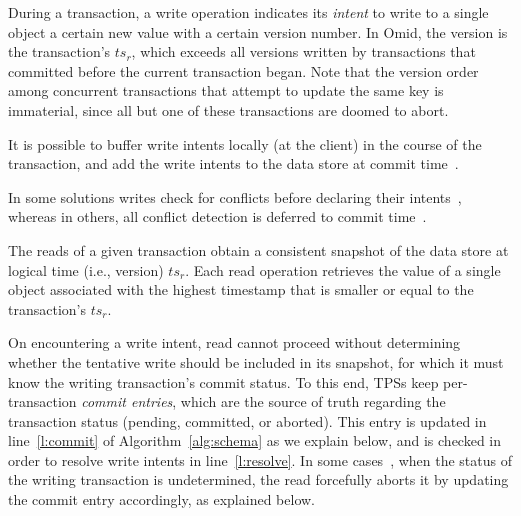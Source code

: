  During a transaction, a write operation indicates its \emph{intent} to write to a single object a certain new value with a certain version number.
In Omid, the version is the transaction's $ts_r$, which exceeds all versions written by transactions that committed before the
current transaction began. Note that the version order among concurrent transactions that  attempt to update the same key is immaterial, 
since all but one of these transactions are doomed to abort. 

It is possible to buffer write intents locally (at the client) in the course of the transaction, and add the write intents to the data store at commit time~\cite{Percolator2010}.

In some solutions writes check for conflicts before declaring their intents~\cite{cockroach}, whereas in others, 
all conflict detection is deferred to commit time~\cite{Percolator2010,OmidICDE2014,Omid2017,tephra}. 

The reads of a given transaction obtain a consistent snapshot of the data store at logical time (i.e., version) $ts_r$.
Each read operation retrieves the value of a single object associated with the highest timestamp that is 
smaller or equal to the transaction's $ts_r$. 

On encountering a write intent, read cannot proceed without determining whether the tentative write should be included in its snapshot,
for which it must know the writing transaction's commit status. 
To this end, TPSs keep per-transaction \emph{commit entries}, which are the source of truth regarding the transaction status 
(pending, committed, or aborted). 
This entry is updated in line~\ref{l:commit} of Algorithm~\ref{alg:schema} as we explain below, 
and is checked in order to resolve write intents in line~\ref{l:resolve}.
In some cases~\cite{Percolator2010,cockroach}, when the status of the writing transaction  is undetermined, the read forcefully aborts
it by updating the commit entry accordingly, as explained below.


